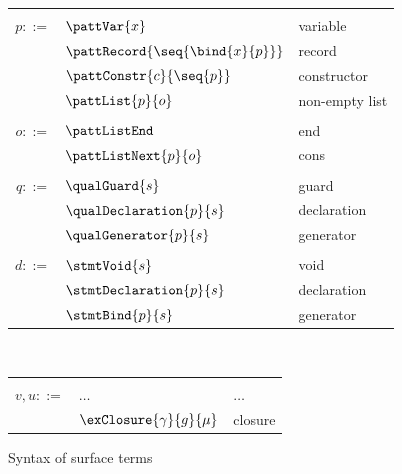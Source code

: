 \begin{figure}
{\begin{minipage}[t]{0.5\textwidth}
\begin{tabularx}{\textwidth}{rL{2.8cm}L{2.9cm}}
      &&
      \\
      $p ::=$
      &
      $\pattVar{x}$
      &
      variable
      \\
      &
      $\pattRecord{\seq{\bind{x}{p}}}$
      &
      record
      \\
      &
      $\pattConstr{c}{\seq{p}}$
      &
      constructor
      \\
      &
      $\pattList{p}{o}$
      &
      non-empty list
      \\[2mm]
      &&
      \\
      $o ::=$
      &
      $\pattListEnd$
      &
      end
      \\
      &
      $\pattListNext{p}{o}$
      &
      cons
      \\[2mm]
      &&
      \\
      $q ::=$
      &
      $\qualGuard{s}$
      &
      guard
      \\
      &
      $\qualDeclaration{p}{s}$
      &
      declaration
      \\
      &
      $\qualGenerator{p}{s}$
      &
      generator
      \\[2mm]
      &&
      \\
      $d ::=$
      &
      $\stmtVoid{s}$
      &
      void
      \\
      &
      $\stmtDeclaration{p}{s}$
      &
      declaration
      \\
      &
      $\stmtBind{p}{s}$
      &
      generator
      \\[13mm]
      \end{tabularx}
   \end{minipage}
   \\[3mm]
   \begin{minipage}[t]{0.48\textwidth}
      \begin{tabularx}{\textwidth}{rL{2.7cm}L{3cm}}
      &&
      \\
      $v, u ::=$
      &
      $\dots$
      &
      $\dots$
      \\
      &
      $\exClosure{\gamma}{g}{\mu}$
      &
      closure
      \\[0mm]
      \end{tabularx}
      \end{minipage}
   }
   \caption{Syntax of surface terms}
\end{figure}

